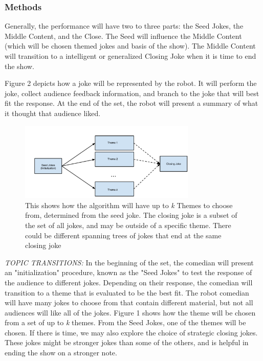 \documentclass[onecolumn, draftclsnofoot,10pt, compsoc]{IEEEtran}
\begin{document}
\subsubsection{Methods}
Generally, the performance will have two to three parts: the Seed Jokes, the Middle Content, and the Close. The Seed will influence the Middle Content (which will be chosen themed jokes and basis of the show). The Middle Content will transition to a intelligent or generalized Closing Joke when it is time to end the show.

Figure 2 depicts how a joke will be represented by the robot. It will perform the joke, collect audience feedback information, and branch to the joke that will best fit the response. At the end of the set, the robot will present a summary of what it thought that audience liked.

\begin{figure}[H]
  \centering
  \includegraphics[width=0.75\textwidth,height=0.75\textheight,keepaspectratio]{fig0}
  \caption{This shows how the algorithm will have up to \textit{k} Themes to choose from, determined from the seed joke. The closing joke is a subset of the set of all jokes, and may be outside of a specific theme. There could be different spanning trees of jokes that end at the same closing joke}
\end{figure}

\textit{TOPIC TRANSITIONS: }In the beginning of the set, the comedian will present an "initialization" procedure, known as the "Seed Jokes" to test the response of the audience to different jokes. Depending on their response, the comedian will transition to a theme that is evaluated to be the best fit. The robot comedian will have many jokes to choose from that contain different material, but not all audiences will like all of the jokes. Figure 1 shows how the theme will be chosen from a set of up to \textit{k} themes. From the Seed Jokes, one of the themes will be chosen. If there is time, we may also explore the choice of strategic closing jokes. These jokes might be stronger jokes than some of the others, and is helpful in ending the show on a stronger note. 
\end{document}
